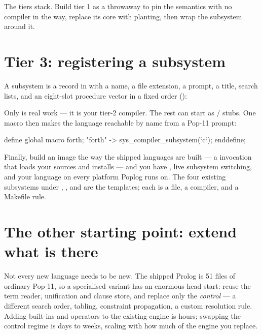 The tiers stack. Build tier 1 as a throwaway to pin the semantics with no
compiler in the way, replace its core with planting, then wrap the subsystem
around it.

\section{Tier 3: registering a subsystem}

A subsystem is a record in  with a name, a file
extension, a prompt, a title, search lists, and an eight-slot procedure
vector in a fixed order ():


Only  is real work --- it is your tier-2 compiler. The
rest can start as / stubs. One macro then makes the
language reachable by name from a Pop-11 prompt:

\begin{pop}
define global macro forth;
    "forth" -> sys_compiler_subsystem(`c`);
enddefine;
\end{pop}

Finally, build an image the way the shipped languages are built --- a
 invocation that loads your sources and installs
 --- and you have , live subsystem
switching, and your language on every platform Poplog runs on. The four
existing subsystems under , , 
and  are the templates; each is a
 file, a compiler, and a Makefile rule.

\section{The other starting point: extend what is there}

Not every new language needs to be new. The shipped Prolog is 51 files of
ordinary Pop-11, so a specialised variant has an enormous head start: reuse
the term reader, unification and clause store, and replace only the
\emph{control} --- a different search order, tabling, constraint propagation,
a custom resolution rule. Adding built-ins and operators to the existing
engine is hours; swapping the control regime is days to weeks, scaling with
how much of the engine you replace.
